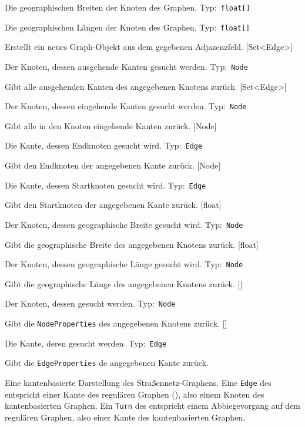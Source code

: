 \documentclass[a4paper, 11pt]{article}
\makeatletter
\def\namedlabel#1#2{\begingroup
    #2%
    \def\@currentlabel{#2}%
    \phantomsection\label{#1}\endgroup
}
\newcommand{\keine}[0]{
  \item[] keine.
}
\newcommand{\class}[4]{
  \newcommand{\currentclass}[0]{#1}
  \item[\namedlabel{K:#1}{\code{#1}}] #2
    \ifstrequal{#3#4}{\keine\keine}{
    }{
      \begin{description}
        \ifstrequal{#3}{\keine}{
        }{
        \item[Attribute] \hfill %
          \begin{description}
            #3
          \end{description}
        }
        \ifstrequal{#4}{\keine}{
        }{
        \item[Methoden] \hfill %
          \begin{description}
            #4
          \end{description}
        }
      \end{description}
    }
  \let\currentclass=\undefined
}
\newcommand{\currentmethod}[0]{#1}
\let\currentmethod=\undefined
\newcommand{\param}[3]{
  \item[\namedlabel{P:\currentclass.\currentmethod.#1}{\code{#1}}] #3 Typ:~\code{#2}
}
\newcommand{\code}[1]{\texttt{#1}}
\makeatother
\begin{document}
{{{{                         }
                   \param{lat}{float[]}{Die geographischen Breiten der Knoten des Graphen.}
                   \param{lon}{float[]}{Die geographischen Längen der Knoten des Graphen.}
                 }
                 {Erstellt ein neues Graph-Objekt aus dem gegebenen Adjazenzfeld.}
          [Set<Edge>]
                 {\param{node}{Node}{Der Knoten, dessen ausgehende Kanten gesucht werden.}}
                 {Gibt alle ausgehenden Kanten des angegebenen Knotens zurück.}
	      [Set<Edge>]
                 {\param{node}{Node}{Der Knoten, dessen eingehende Kanten gesucht werden.}}
                 {Gibt alle in den Knoten eingehende Kanten zurück.}
          [Node]
                 {\param{edge}{Edge}{Die Kante, dessen Endknoten gesucht wird.}}
                 {Gibt den Endknoten der angegebenen Kante zurück.}
          [Node]
                 {\param{edge}{Edge}{Die Kante, dessen Startknoten gesucht wird.}}
                 {Gibt den Startknoten der angegebenen Kante zurück.}       
          [float]
                 {\param{node}{Node}{Der Knoten, dessen geographische Breite gesucht wird.}}
                 {Gibt die geographische Breite des angegebenen Knotens zurück.}
          [float]
                 {\param{node}{Node}{Der Knoten, dessen geographische Länge gesucht wird.}}
                 {Gibt die geographische Länge des angegebenen Knotens zurück.}
          []
                 {\param{node}{Node}{Der Knoten, dessen \refclass{NodeProperties} gesucht werden.}}
                 {Gibt die \code{NodeProperties} des angegebenen Knotens zurück.}
          []
                 {\param{edge}{Edge}{Die Kante, deren \refclass{EdgeProperties} gesucht werden.}}
                 {Gibt die \code{EdgeProperties} de angegebenen Kante zurück.}
        }
        {
          Eine kantenbasierte Darstellung des Straßennetz-Graphens.
          Eine \code{Edge} des  entspricht einer Kante des regulären Graphen (), also einem Knoten des kantenbasierten Graphen.
          Ein \code{Turn} des  entspricht einem Abbiegevorgang auf dem regulären Graphen, also einer Kante des kantenbasierten Graphen.
          
}}
\end{document}
